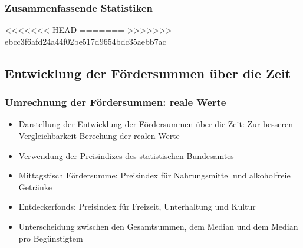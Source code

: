 \begin{frame}[fragile]
\frametitle{Zusammenfassende Statistiken}
<<<<<<< HEAD
=======
>>>>>>> ebcc3f6afd24a44f02be517d9654bdc35aebb7ac
\begin{table}[ht]
\centering
{}
\caption{Summary Statistics} 
\label{fundamentalDynamics}
\end{table}

\end{frame}

\subsection{Entwicklung der Fördersummen über die Zeit}

\begin{frame}[fragile]
\frametitle{Umrechnung der Fördersummen: reale Werte}
\begin{itemize}
  \item{Darstellung der Entwicklung der Fördersummen über die Zeit: Zur besseren Vergleichbarkeit Berechung der realen Werte}
  \item{Verwendung der Preisindizes des statistischen Bundesamtes}
  \item{Mittagstisch Fördersumme: Preisindex für Nahrungsmittel und alkoholfreie Getränke}
  \item{Entdeckerfonds: Preisindex für Freizeit, Unterhaltung und Kultur}
  \item{Unterscheidung zwischen den Gesamtsummen, dem Median und dem Median pro Begünstigtem}
\end{itemize}
\end{frame}

